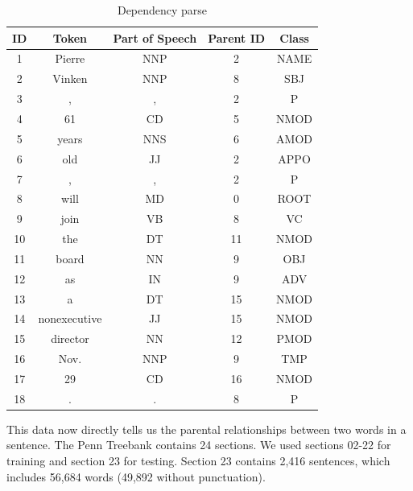 \documentclass[12pt]{amsart}
\begin{document}
\begin{table}
\label{dependency_parse}
\caption{Dependency parse}
        \begin{tabular}{ccccc}
\hline \hline
            ID & Token & Part of Speech & Parent ID & Class \\ 
            \hline
            1 &Pierre & NNP & 2 & NAME \\
            2 & Vinken & NNP & 8 & SBJ\\
            3 & , & , & 2 & P\\
            4 & 61 & CD & 5 & NMOD\\
            5 & years & NNS & 6 & AMOD\\
            6 & old & JJ & 2 & APPO\\
            7 & , & , & 2 & P\\
            8 & will & MD & 0 & ROOT\\
            9 & join & VB & 8 & VC\\
            10 & the & DT & 11 & NMOD\\
            11 & board & NN & 9 & OBJ\\
            12 & as & IN & 9 & ADV\\
            13 & a & DT & 15 & NMOD\\
            14 & nonexecutive & JJ & 15 & NMOD\\
            15 & director & NN & 12 & PMOD\\
            16 & Nov. & NNP & 9 & TMP\\
            17 & 29 & CD & 16 & NMOD\\
            18 & . & . & 8 & P\\
            \hline
        \end{tabular}
\end{table}

This data now directly tells us the parental relationships between two words in a sentence. The Penn Treebank contains 24 sections. We used sections 02-22 for training and section 23 for testing. Section 23 contains 2,416 sentences, which includes 56,684 words (49,892 without punctuation).
\end{document}
